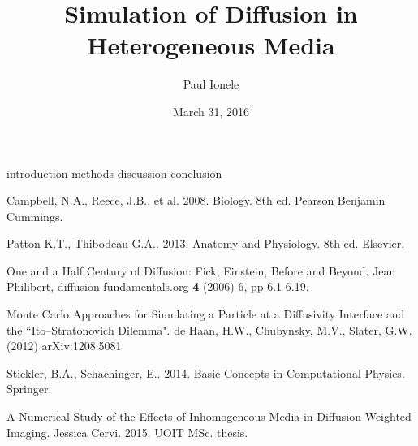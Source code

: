 \documentclass{jthesis}
\title{Simulation of Diffusion in Heterogeneous Media}
\date{March 31, 2016}
\author{Paul Ionele}
\begin{document}
\maketitle



\makedeclaration

\maketableofcontents

\doublespacing

{introduction}
\newpage
{methods}
\newpage
{discussion}
\newpage
{conclusion}

\begin{thebibliography}{}

 Campbell, N.A., Reece, J.B., et al. 2008. Biology. 8th ed. Pearson Benjamin Cummings.

 Patton K.T., Thibodeau G.A.. 2013. Anatomy and Physiology. 8th ed. Elsevier.

 One and a Half Century of Diffusion: Fick, Einstein, Before and Beyond. Jean Philibert, diffusion-fundamentals.org \textbf{4} (2006) 6, pp 6.1-6.19.

 Monte Carlo Approaches for Simulating a Particle at a Diffusivity Interface and the ``Ito--Stratonovich Dilemma". de Haan, H.W., Chubynsky, M.V., Slater, G.W. (2012) arXiv:1208.5081

 Stickler, B.A., Schachinger, E.. 2014. Basic Concepts in Computational Physics. Springer.

 A Numerical Study of the Effects of Inhomogeneous Media in Diffusion Weighted Imaging. Jessica Cervi. 2015. UOIT MSc. thesis.

\end{thebibliography}


\end{document}
